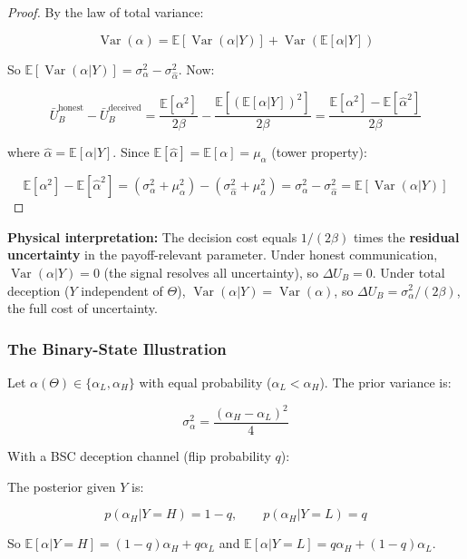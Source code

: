 \documentclass[11pt]{article}
\theoremstyle{plain}
\theoremstyle{definition}
\theoremstyle{remark}
\let\origsubsubsection\subsubsection
\renewcommand{\subsubsection}{\needspace{4\baselineskip}\origsubsubsection}
\begin{document}
\begin{proof}
By the law of total variance:

$$\operatorname{Var}(\alpha) = \mathbb{E}[\operatorname{Var}(\alpha | Y)] + \operatorname{Var}(\mathbb{E}[\alpha | Y])$$

So $\mathbb{E}[\operatorname{Var}(\alpha | Y)] = \sigma_\alpha^2 - \sigma_{\hat{\alpha}}^2$. Now:

$$\bar{U}_B^{\text{honest}} - \bar{U}_B^{\text{deceived}} = \frac{\mathbb{E}[\alpha^2]}{2\beta} - \frac{\mathbb{E}[(\mathbb{E}[\alpha|Y])^2]}{2\beta} = \frac{\mathbb{E}[\alpha^2] - \mathbb{E}[\hat{\alpha}^2]}{2\beta}$$

where $\hat{\alpha} = \mathbb{E}[\alpha | Y]$. Since $\mathbb{E}[\hat{\alpha}] = \mathbb{E}[\alpha] = \mu_\alpha$ (tower property):

$$\mathbb{E}[\alpha^2] - \mathbb{E}[\hat{\alpha}^2] = (\sigma_\alpha^2 + \mu_\alpha^2) - (\sigma_{\hat{\alpha}}^2 + \mu_\alpha^2) = \sigma_\alpha^2 - \sigma_{\hat{\alpha}}^2 = \mathbb{E}[\operatorname{Var}(\alpha | Y)]$$
\end{proof}

\textbf{Physical interpretation:} The decision cost equals
\(1/(2\beta)\) times the \textbf{residual uncertainty} in the
payoff-relevant parameter. Under honest communication,
\(\operatorname{Var}(\alpha | Y) = 0\) (the signal resolves all
uncertainty), so \(\Delta U_B = 0\). Under total deception (\(Y\)
independent of \(\Theta\)),
\(\operatorname{Var}(\alpha | Y) = \operatorname{Var}(\alpha)\), so
\(\Delta U_B = \sigma_\alpha^2 / (2\beta)\), the full cost of
uncertainty.

\subsubsection{The Binary-State
Illustration}\label{the-binary-state-illustration}

Let \(\alpha(\Theta) \in \{\alpha_L, \alpha_H\}\) with equal probability
(\(\alpha_L < \alpha_H\)). The prior variance is:

\[\sigma_\alpha^2 = \frac{(\alpha_H - \alpha_L)^2}{4}\]

With a BSC deception channel (flip probability \(q\)):

The posterior given \(Y\) is:

\[p(\alpha_H | Y = H) = 1 - q, \qquad p(\alpha_H | Y = L) = q\]

So \(\mathbb{E}[\alpha | Y = H] = (1-q)\alpha_H + q\alpha_L\) and
\(\mathbb{E}[\alpha | Y = L] = q\alpha_H + (1-q)\alpha_L\).
\end{document}

